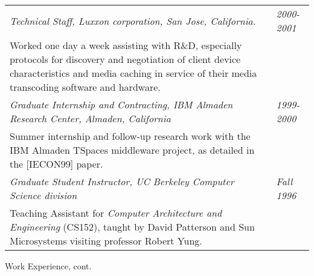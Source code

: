 \begin{tabular}{p{5.2in}@{\hspace{1.5cm}}l}
    \em Technical Staff, Luxxon corporation, San Jose, California. &\em  2000-2001 \\[3pt]
       Worked one day a week assisting with R\&D, especially
       protocols for discovery and negotiation of client
       device characteristics and media caching in service of their media transcoding
       software and hardware. \\[9pt]

    \em Graduate Internship and Contracting, IBM Almaden Research Center, 
          Almaden, California                         & \em 1999-2000 \\[3pt]
       Summer internship and follow-up research work with
       the IBM Almaden TSpaces middleware project, as detailed in the [IECON99] paper. \\[9pt]


    \em Graduate Student Instructor, UC Berkeley Computer Science division
                                                                 & \em Fall 1996 \\[3pt]
       Teaching Assistant for {\em Computer Architecture and
       Engineering} (CS152), taught by David Patterson and
       Sun Microsystems visiting professor Robert Yung. \\[9pt]

\end{tabular}


\newpage
\begin{bf} \large
Work Experience, cont.
\end{bf}
\medskip

